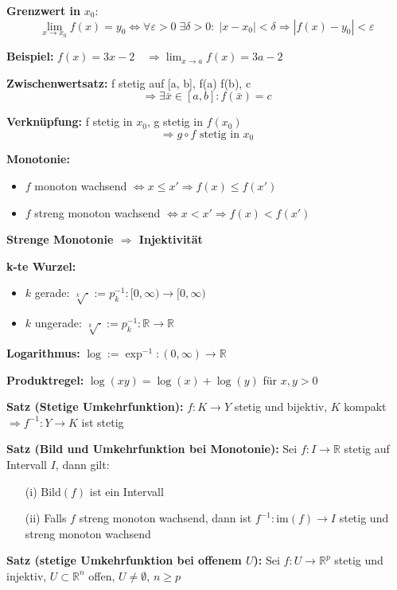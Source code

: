 \textbf{Grenzwert in } $x_0$:  
\[
\lim_{x \to x_0} f(x) = y_0 \Leftrightarrow
\forall \varepsilon > 0\; \exists \delta > 0:\; |x - x_0| < \delta \Rightarrow |f(x) - y_0| < \varepsilon
\]

\textbf{Beispiel:}  
$f(x) = 3x - 2 \quad \Rightarrow \lim_{x \to a} f(x) = 3a - 2$

\textbf{Zwischenwertsatz:}  
f stetig auf [a, b],\; f(a) \leq f(b),\; c \in [f(a), f(b)]  
\[
\Rightarrow \exists \bar{x} \in [a, b]: f(\bar{x}) = c
\]

\textbf{Verknüpfung:}  
f stetig in \( x_0 \),\; g stetig in \( f(x_0) \)  
\[
\Rightarrow g \circ f \text{ stetig in } x_0
\]

\textbf{Monotonie:}
\begin{itemize}
  \item \(f\) monoton wachsend \(\Leftrightarrow x \le x' \Rightarrow f(x) \le f(x')\)
  \item \(f\) streng monoton wachsend \(\Leftrightarrow x < x' \Rightarrow f(x) < f(x')\)
\end{itemize}

\textbf{Strenge Monotonie $\Rightarrow$ Injektivität}

\textbf{k-te Wurzel:}
\begin{itemize}
  \item \(k\) gerade: \(\sqrt[k]{\cdot} := p_k^{-1}: [0, \infty) \to [0, \infty)\)
  \item \(k\) ungerade: \(\sqrt[k]{\cdot} := p_k^{-1}: \mathbb{R} \to \mathbb{R}\)
\end{itemize}

\textbf{Logarithmus:}  
\(\log := \exp^{-1} : (0,\infty) \to \mathbb{R}\)

\textbf{Produktregel:}  
\(\log(xy) = \log(x) + \log(y)\) für \(x, y > 0\)

\textbf{Satz (Stetige Umkehrfunktion):}  
\(f: K \to Y\) stetig und bijektiv,\; \(K\) kompakt  
\(\Rightarrow f^{-1}: Y \to K\) ist stetig

\textbf{Satz (Bild und Umkehrfunktion bei Monotonie):}  
Sei \(f: I \to \mathbb{R}\) stetig auf Intervall \(I\), dann gilt:
\begin{itemize}
  \item[(i)] \(\text{Bild}(f)\) ist ein Intervall
  \item[(ii)] Falls \(f\) streng monoton wachsend, dann ist \(f^{-1}: \text{im}(f) \to I\) stetig und streng monoton wachsend
\end{itemize}

\textbf{Satz (stetige Umkehrfunktion bei offenem \(U\)):}  
Sei \(f: U \to \mathbb{R}^p\) stetig und injektiv, \(U \subset \mathbb{R}^n\) offen, \(U \ne \emptyset\), \(n \ge p\)

